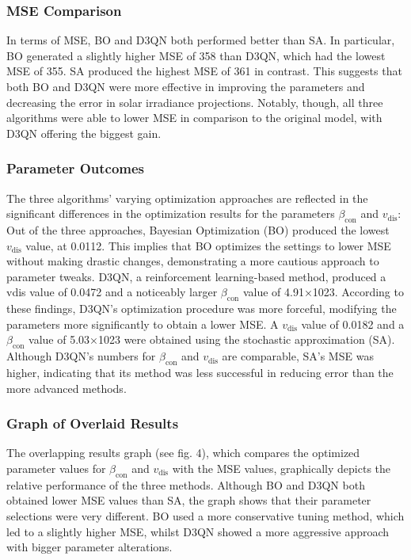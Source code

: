 \documentclass[conference]{IEEEtran}
\begin{document}
\subsubsection{MSE Comparison}
In terms of MSE, BO and D3QN both performed better than SA. In particular, BO generated a slightly higher MSE of 358 than D3QN, which had the lowest MSE of 355. SA produced the highest MSE of 361 in contrast. This suggests that both BO and D3QN were more effective in improving the parameters and decreasing the error in solar irradiance projections. Notably, though, all three algorithms were able to lower MSE in comparison to the original model, with D3QN offering the biggest gain.

\subsubsection{Parameter Outcomes}
The three algorithms' varying optimization approaches are reflected in the significant differences in the optimization results for the parameters \(\beta_{\text{con}}\) and \(v_{\text{dis}}\):
Out of the three approaches, Bayesian Optimization (BO) produced the lowest \(v_{\text{dis}}\) value, at 0.0112. This implies that BO optimizes the settings to lower MSE without making drastic changes, demonstrating a more cautious approach to parameter tweaks. D3QN, a reinforcement learning-based method, produced a vdis value of 0.0472 and a noticeably larger \(\beta_{\text{con}}\) value of 4.91×1023. According to these findings, D3QN's optimization procedure was more forceful, modifying the parameters more significantly to obtain a lower MSE. A \(v_{\text{dis}}\) value of 0.0182 and a \(\beta_{\text{con}}\) value of 5.03×1023 were obtained using the stochastic approximation (SA). Although D3QN's numbers for \(\beta_{\text{con}}\) and \(v_{\text{dis}}\) are comparable, SA's MSE was higher, indicating that its method was less successful in reducing error than the more advanced methods.

\subsubsection{Graph of Overlaid Results}
The overlapping results graph (see fig. 4), which compares the optimized parameter values for \(\beta_{\text{con}}\) and \(v_{\text{dis}}\) with the MSE values, graphically depicts the relative performance of the three methods. Although BO and D3QN both obtained lower MSE values than SA, the graph shows that their parameter selections were very different. BO used a more conservative tuning method, which led to a slightly higher MSE, whilst D3QN showed a more aggressive approach with bigger parameter alterations.
\end{document}
